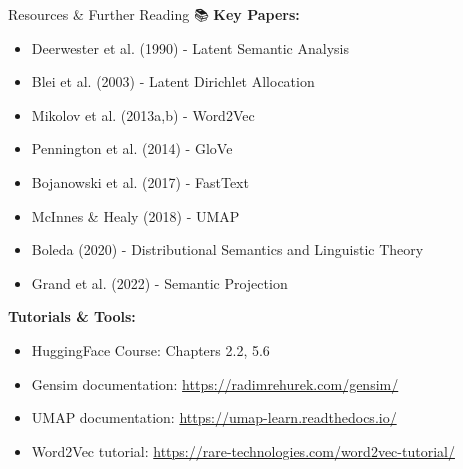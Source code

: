 \documentclass[aspectratio=169]{beamer}
\begin{document}
\begin{frame}[shrink=10]{Resources \& Further Reading 📚}
\textbf{Key Papers:}
\begin{itemize}\setlength{\itemsep}{0pt}
    \item Deerwester et al. (1990) - Latent Semantic Analysis
    \item Blei et al. (2003) - Latent Dirichlet Allocation
    \item Mikolov et al. (2013a,b) - Word2Vec
    \item Pennington et al. (2014) - GloVe
    \item Bojanowski et al. (2017) - FastText
    \item McInnes \& Healy (2018) - UMAP
    \item Boleda (2020) - Distributional Semantics and Linguistic Theory
    \item Grand et al. (2022) - Semantic Projection
\end{itemize}

\vspace{0.5em}

\textbf{Tutorials \& Tools:}
\begin{itemize}\setlength{\itemsep}{0pt}
    \item HuggingFace Course: Chapters 2.2, 5.6
    \item Gensim documentation: \url{https://radimrehurek.com/gensim/}
    \item UMAP documentation: \url{https://umap-learn.readthedocs.io/}
    \item Word2Vec tutorial: \url{https://rare-technologies.com/word2vec-tutorial/}
\end{itemize}
\end{frame}
\end{document}
